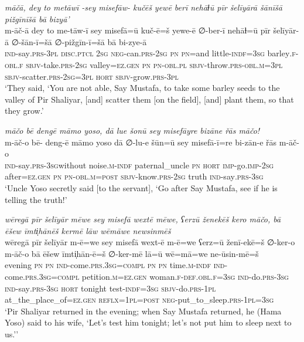 \ea \label{ŽP.27}
\textit{māčā, dey to metāwī -sey misefāw- kučēš yewē berī nehāɫū pīr šelīyārā šānīšā pižgīnīšā bā bizyā’} \\ 
\gll m-āč-ā dey to me-tāw-ī sey misefā=ū kuč-ē=š yewe-ē ∅-ber-ī nehāɫ=ū pīr šelīyār-ā ∅-šān-ī=šā ∅-pižgīn-ī=šā bā bi-zye-ā \\ 
 \textsc{ind-}say\textsc{.prs}\textsc{-3pl} \textsc{disc.ptcl} \textsc{2sg} \textsc{neg-}can\textsc{.prs}-\textsc{2sg} \textsc{pn} \textsc{pn}=and little\textsc{-indf}\textsc{=3sg} barley\textsc{.f}\textsc{-obl}\textsc{.f} \textsc{sbjv-}take\textsc{.prs}-\textsc{2sg} valley\textsc{\textsc{=ez.gen}} \textsc{pn} \textsc{pn}\textsc{-obl}\textsc{.pl} \textsc{sbjv-}throw\textsc{.prs}\textsc{-obl}\textsc{.m}\textsc{=3pl} \textsc{sbjv-}scatter\textsc{.prs}-\textsc{2sg}\textsc{=3pl} \textsc{hort} \textsc{sbjv-}grow\textsc{.prs}\textsc{-3pl} \\ 
\glt `They said, ‘You are not able, Say Mustafa, to take some barley seeds to the valley of Pir Shaliyar, [and] scatter them [on the field], [and] plant them, so that they grow.'
\z 
 
\ea \label{ŽP.43}
\textit{māčo bē dengē māmo yoso, dā lue šonū sey misefāyre bizāne řās māčo!} \\ 
\gll m-āč-o bē- deng-ē māmo yoso dā ∅-lu-e šūn=ū sey misefā-ī=re bi-zān-e řās m-āč-o \\ 
 \textsc{ind-}say\textsc{.prs}\textsc{-3sg}without noise\textsc{.m}\textsc{-indf} paternal\_uncle \textsc{pn} \textsc{hort} \textsc{imp-}go.\textsc{imp-}\textsc{2sg} after\textsc{\textsc{=ez.gen}} \textsc{pn} \textsc{pn}\textsc{-obl}\textsc{.m}\textsc{=\textsc{post}} \textsc{sbjv-}know\textsc{.prs}-\textsc{2sg} truth \textsc{ind-}say\textsc{.prs}\textsc{-3sg} \\ 
\glt `Uncle Yoso secretly said [to the servant], ‘Go after Say Mustafa, see if he is telling the truth!'
\z 
 
\ea \label{ŽP.62}
\textit{wēregā pīr šelīyār mēwe sey misefā wextē mēwe, ʕerzū ženekēš kero māčo, bā ēšew īmti̩hānēš kermē lāw wēmāwe newsinmēš} \\ 
\gll wēregā pīr šelīyār m-ē=we sey misefā wext-ē m-ē=we ʕerz=ū ženī-ekē=š ∅-ker-o m-āč-o bā ēšew īmti̩hān-ē=š ∅-ker-mē lā=ū wē=mā=we ne-ūsin-mē=š \\ 
 evening \textsc{pn} \textsc{pn} \textsc{ind-}come\textsc{.prs}\textsc{.3sg}\textsc{=compl} \textsc{pn} \textsc{pn} time\textsc{.m}\textsc{-indf} \textsc{ind-}come\textsc{.prs}\textsc{.3sg}\textsc{=compl} petition\textsc{.m}\textsc{\textsc{=ez.gen}} woman\textsc{.f}\textsc{-def}\textsc{.obl}\textsc{.f}\textsc{=3sg} \textsc{ind-}do\textsc{.prs}\textsc{-3sg} \textsc{ind-}say\textsc{.prs}\textsc{-3sg} \textsc{hort} tonight test\textsc{-indf}\textsc{=3sg} \textsc{sbjv-}do\textsc{.prs}\textsc{-1pl} at\_the\_place\_of\textsc{\textsc{=ez.gen}} \textsc{reflx}\textsc{=1pl}\textsc{=\textsc{post}} \textsc{neg-}put\_to\_sleep\textsc{.prs}\textsc{-1pl}\textsc{=3sg} \\ 
\glt `Pir Shaliyar returned in the evening; when Say Mustafa returned, he (Hama Yoso) said to his wife, ‘Let’s test him tonight; let’s not put him to sleep next to us.’'
\z 
 
